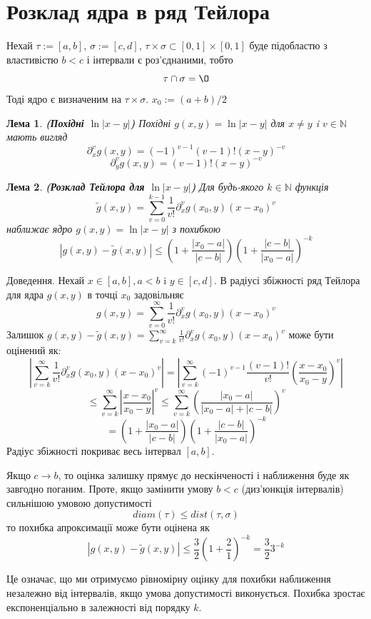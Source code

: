 \documentclass[12pt]{report}
\begin{document}
	\section{Розклад ядра в ряд Тейлора}
	\hspace{0.8cm}Нехай $\tau:=[a,b]$, $\sigma:=[c,d]$, $\tau\times\sigma\subset[0,1]\times[0,1]$ буде підобластю з властивістю $b<c$ і інтервали є роз'єднаними, тобто $$\tau\cap\sigma=\O$$
	Тоді ядро є визначеним на $\tau\times\sigma$. $x_0:=(a+b)/2$
	\newtheorem{Lem}{Лема}[chapter]
	\begin{Lem}
		{\bf (Похідні $\ln|x-y|$)} Похідні $g(x,y)=\ln|x-y|$ для $x\not=y$ i $v\in \mathbb{N}$ мають вигляд
		$$\partial^v_xg(x,y)=(-1)^{v-1}(v-1)!(x-y)^{-v}$$
		$$\partial^v_yg(x,y)=(v-1)!(x-y)^{-v}$$
	\end{Lem}
	\begin{Lem}
	{\bf (Розклад Тейлора для $\ln|x-y|$)} Для будь-якого $k\in \mathbb{N}$ функція 
	$$\tilde{g}(x,y)=\sum_{v=0}^{k-1}\frac{1}{v!}\partial^v_xg(x_0,y)(x-x_0)^v$$
	наближає ядро $g(x,y)=\ln|x-y|$ з похибкою
	$$|g(x,y)-\tilde{g}(x,y)|\le(1+\frac{|x_0-a|}{|c-b|})(1+\frac{|c-b|}{|x_0-a|})^{-k}$$
	\end{Lem}
	 Доведення. Нехай $x\in [a,b],a<b$ i $y\in [c,d]$. В радіусі збіжностi ряд Тейлора для ядра $g(x,y)$ в точці $x_0$ задовільняє $$g(x,y)=\sum_{v=0}^{\infty}\frac{1}{v!}\partial^v_xg(x_0,y)(x-x_0)^v$$
	Залишок $g(x,y)-\tilde{g}(x,y)=\sum_{v=k}^{\infty}\frac{1}{v!}\partial^v_xg(x_0,y)(x-x_0)^v$ може бути оцінений як:
	$$|\sum_{v=k}^{\infty}\frac{1}{v!}\partial^v_xg(x_0,y)(x-x_0)^v|= |\sum_{v=k}^{\infty}(-1)^{v-1}\frac{(v-1)!}{v!}\genfrac{(}{)}{1pt}{0}{x-x_0}{x_0-y}^v|$$
	$$\le \sum_{v=k}^{\infty}|\frac{x-x_0}{x_0-y}|^v\le\sum_{v=k}^{\infty}\genfrac{(}{)}{1pt}{0}{|x_0-a|}{|x_0-a|+|c-b|}^v $$
	$$=(1+\frac{|x_0-a|}{|c-b|})(1+\frac{|c-b|}{|x_0-a|})^{-k}$$
	\newline Радіус збіжності покриває весь інтервал $[a,b]$. 
	\newline
	\par Якщо $c\rightarrow b$, то оцінка залишку прямує до нескінченості і наближення буде як завгодно поганим. Проте, якщо замінити умову $b<c$ (диз'юнкція інтервалів) сильнішою умовою допустимості
	$$diam(\tau)\le dist(\tau,\sigma)$$
	то похибка апроксимації може бути оцінена як 
	$$|g(x,y)-\tilde{g}(x,y)|\le\frac{3}{2}(1+\frac{2}{1})^{-k}=\frac{3}{2}3^{-k}$$
	\par Це означає, що ми отримуємо рівномірну оцінку для похибки наближення незалежно від інтервалів, якщо умова допустимості виконується. Похибка зростає експоненціально в залежності від порядку $k$.
\end{document}
